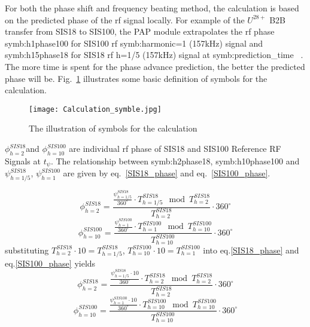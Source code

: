 
For both the phase shift and frequency beating method, the calculation is based on the predicted phase of the rf signal locally. For example of the $U^{28+}$ B2B transfer from SIS18 to SIS100, the PAP module extrapolates the rf phase \gls{symb:h1phase100} for SIS100 rf \gls{symb:harmonic}=1 (157kHz) signal and \gls{symb:h15phase18} for SIS18 rf h=1/5 (157kHz) signal at \gls{symb:prediction_time} ~\cite{ferrand_system_2015}. The more time is spent for the phase advance prediction, the better the predicted phase will be. Fig.~\ref{Calculation_symble} illustrates some basic definition of symbols for the calculation. 
\begin{figure}[!htb]
   \centering   
   \texttt{[image: Calculation\_symble.jpg]}
   \caption{The illustration of symbols for the calculation}
   \label{Calculation_symble}
\end{figure}
$\phi_{h=2}^{SIS18}$and $\phi_{h=10}^{SIS100}$ are individual rf phase of SIS18 and SIS100 Reference RF Signals at $t_{\psi}$. The relationship between \gls{symb:h2phase18}, \gls{symb:h10phase100} and $\psi_{h=1/5}^{SIS18}$, $\psi_{h=1}^{SIS100}$ are given by eq.~\ref{SIS18_phase} and eq.~\ref{SIS100_phase}. 

\begin{equation}
\phi_{h=2}^{SIS18} =  \frac {\frac{\psi_{h=1/5}^{SIS18}}{360^\circ}\cdot {T_{h=1/5}^{SIS18}} \mod {T_{h=2}^{SIS18}}}{T_{h=2}^{SIS18}}\cdot {360^\circ} \label{SIS18_phase}
\end{equation}
\begin{equation}
\phi_{h=10}^{SIS100} =  \frac {\frac{\psi_{h=1}^{SIS100}}{360^\circ}\cdot {T_{h=1}^{SIS100}} \mod {T_{h=10}^{SIS100}}}{T_{h=10}^{SIS100}}\cdot {360^\circ} \label{SIS100_phase}
\end{equation}
substituting $T_{h=2}^{SIS18}\cdot 10=T_{h=1/5}^{SIS18}$, $T_{h=10}^{SIS100}\cdot 10=T_{h=1}^{SIS100}$ into eq.\ref{SIS18_phase} and eq.\ref{SIS100_phase} yields
 \begin{equation}
\phi_{h=2}^{SIS18} =  \frac {\frac{\psi_{h=1/5}^{SIS18}\cdot 10}{360^\circ}\cdot {T_{h=2}^{SIS18}} \mod {T_{h=2}^{SIS18}}}{T_{h=2}^{SIS18}}\cdot {360^\circ} \label{SIS18_phase1}
\end{equation}
\begin{equation}
\phi_{h=10}^{SIS100} =  \frac {\frac{\psi_{h=1}^{SIS100}\cdot 10}{360^\circ}\cdot {T_{h=10}^{SIS100}} \mod {T_{h=10}^{SIS100}}}{T_{h=10}^{SIS100}}\cdot {360^\circ} \label{SIS100_phase1}
\end{equation}

